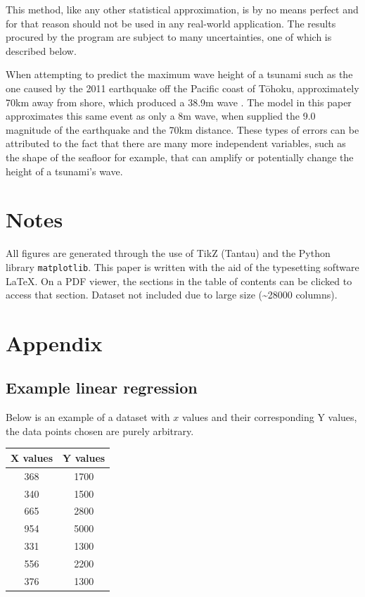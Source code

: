 \documentclass[11pt,letterpaper]{article}
\begin{document}
This method, like any other statistical approximation, is by no means perfect and for that reason should not be used in any real-world application. The results procured by the program are subject to many uncertainties, one of which is described below.

When attempting to predict the maximum wave height of a tsunami such as the one caused by the 2011 earthquake off the Pacific coast of Tōhoku, approximately 70km away from shore, which produced a 38.9m wave \cite{yomiuri_2011}. The model in this paper approximates this same event as only a 8m wave, when supplied the 9.0 magnitude of the earthquake and the 70km distance. These types of errors can be attributed to the fact that there are many more independent variables, such as the shape of the seafloor for example, that can amplify or potentially change the height of a tsunami's wave.


\newpage
{}


\section*{Notes}
\label{sec:notes}

All figures are generated through the use of TikZ (Tantau) and the Python library \verb|matplotlib|. This paper is written with the aid of the typesetting software \LaTeX. On a PDF viewer, the sections in the table of contents can be clicked to access that section. Dataset not included due to large size (\textasciitilde 28000 columns).

\printbibliography[heading=bibintoc, title=Works Cited]

\appendix
\section{Appendix}
\label{app}
\subsection{Example linear regression}
\label{app:regression}

Below is an example of a dataset with $x$ values and their corresponding Y values, the data points chosen are purely arbitrary.

\begin{center}
    \begin{tabular}{||c c||}
        \hline
        X values & Y values \\ [0.5ex]
        \hline\hline
        368      & 1700     \\
        \hline
        340      & 1500     \\
        \hline
        665      & 2800     \\
        \hline
        954      & 5000     \\
        \hline
        331      & 1300     \\
        \hline
        556      & 2200     \\
        \hline
        376      & 1300     \\ [1ex]
        \hline
    \end{tabular}
\end{center}
\end{document}
